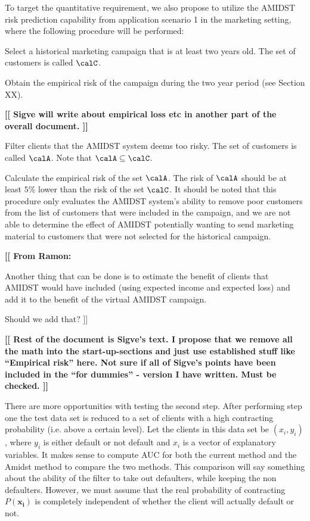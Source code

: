 \documentclass{article}
\theoremstyle{theorem}
\theoremstyle{definition}
\newcommand{\bv}[1]{\bm{#1}}
\newcommand{\comment}[1]{ \begin{center}{\bf [[ #1 ]]}\end{center}}
\begin{document}
To target the quantitative requirement, we also propose to utilize the AMIDST risk prediction capability from application scenario 1 in the marketing setting, where the following procedure will be performed:
\bit
\item Select a historical marketing campaign that is at least two years old. The set of customers is called $\calC$.
\item Obtain the empirical risk of the campaign during the two year period (see Section XX). \comment{Sigve will write about empirical loss etc in another part of the overall document.} 
\item  Filter clients that the AMIDST system deems too risky. The set of customers is called $\calA$. Note that $\calA\subseteq\calC$.
\item Calculate the empirical risk of the set $\calA$. The risk of $\calA$ should be at least $5\%$ lower than the risk of the set $\calC$.
\eit
It should be noted that this procedure only evaluates the AMIDST system's ability to remove poor customers from the list of customers that were included in the campaign, and we are not able to determine the effect of AMIDST potentially wanting to send marketing material to customers that were not selected for the historical campaign. 


\comment{From Ramon:

\bit
\item Another thing that can be done is to estimate the benefit of clients that AMIDST would have included (using expected income and expected loss) and add it to the benefit of the virtual AMIDST campaign.
\eit

Should we add that?}




\comment{Rest of the document is Sigve's text. I propose that we remove all the math into the start-up-sections and just use established stuff like ``Empirical risk'' here. Not sure if all of Sigve's points have been included in the ``for dummies'' - version I have written. Must be checked.}



There are more opportunities with testing the second step.  After performing step one the test data set is reduced to a set of clients with a high contracting probability (i.e. above a certain level).  Let the clients in this data set be $(x_i, y_i)$, where $y_i$ is either default or not default and $x_i$ is a vector of explanatory variables.  It makes sense to compute AUC for both the current method and the Amidst method to compare the two methods.  This comparison will say something about the ability of the filter to take out defaulters, while keeping the non defaulters.  However, we must assume that the real probability of contracting $P(\bv{x_i})$ is completely independent of whether the client will actually default or not.
\end{document}
